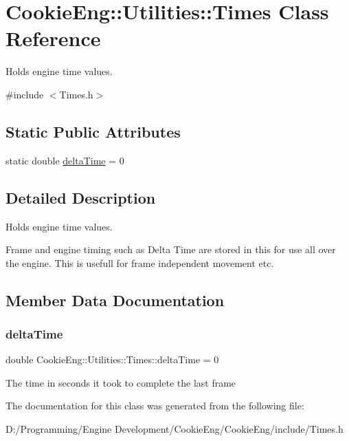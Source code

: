 \hypertarget{struct_cookie_eng_1_1_utilities_1_1_times}{}\section{Cookie\+Eng\+:\+:Utilities\+:\+:Times Class Reference}
\label{struct_cookie_eng_1_1_utilities_1_1_times}


Holds engine time values.  




{\ttfamily \#include $<$Times.\+h$>$}

\subsection*{Static Public Attributes}
\begin{DoxyCompactItemize}
\item 
static double \hyperlink{struct_cookie_eng_1_1_utilities_1_1_times_abab3889716480204f7250ff3347b8392}{delta\+Time} = 0
\end{DoxyCompactItemize}


\subsection{Detailed Description}
Holds engine time values. 

Frame and engine timing such as Delta Time are stored in this for use all over the engine. This is usefull for frame independent movement etc. 

\subsection{Member Data Documentation}
\mbox{\label{struct_cookie_eng_1_1_utilities_1_1_times_abab3889716480204f7250ff3347b8392}} 
\subsubsection{\texorpdfstring{delta\+Time}{deltaTime}}
{\footnotesize\ttfamily double Cookie\+Eng\+::\+Utilities\+::\+Times\+::delta\+Time = 0\hspace{0.3cm}{\ttfamily [static]}}

The time in seconds it took to complete the last frame 

The documentation for this class was generated from the following file\+:\begin{DoxyCompactItemize}
\item 
D\+:/\+Programming/\+Engine Development/\+Cookie\+Eng/\+Cookie\+Eng/include/Times.\+h\end{DoxyCompactItemize}
